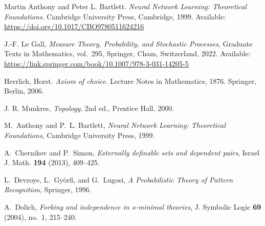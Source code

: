 \begin{thebibliography}{999}
%
%
%
%

    Martin Anthony and Peter L. Bartlett.
    \textit{Neural Network Learning: Theoretical Foundations}.
    Cambridge University Press, Cambridge, 1999.
    Available: \url{https://doi.org/10.1017/CBO9780511624216}

    J.-F. Le Gall,
    \textit{Measure Theory, Probability, and Stochastic Processes},
    Graduate Texts in Mathematics, vol.~295,
    Springer, Cham, Switzerland, 2022.
    Available: \url{https://link.springer.com/book/10.1007/978-3-031-14205-5}

    Herrlich, Horst.
    \textit{Axiom of choice}.
    Lecture Notes in Mathematics, 1876.
    Springer, Berlin, 2006.



    J. R. Munkres, \textit{Topology}, 2nd ed., Prentice Hall, 2000.


    M.~Anthony and P.~L. Bartlett, \emph{Neural Network Learning: Theoretical
    Foundations}, Cambridge University Press, 1999.

    A.~Chernikov and P.~Simon, \emph{Externally definable sets and dependent
    pairs}, Israel J. Math. \textbf{194} (2013), 409--425.

    L.~Devroye, L.~Györfi, and G.~Lugosi, \emph{A Probabilistic Theory of Pattern
    Recognition}, Springer, 1996.

    A.~Dolich, \emph{Forking and independence in o-minimal theories}, J. Symbolic
    Logic \textbf{69} (2004), no.~1, 215--240.


\end{thebibliography}
